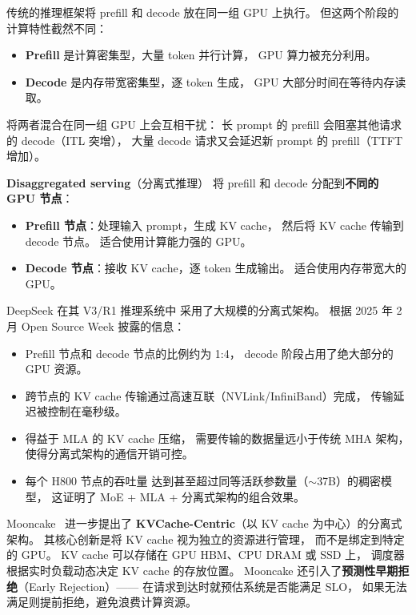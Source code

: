 传统的推理框架将 prefill 和 decode 放在同一组 GPU 上执行。
但这两个阶段的计算特性截然不同：
\begin{itemize}[noitemsep]
  \item \textbf{Prefill} 是计算密集型，大量 token 并行计算，
        GPU 算力被充分利用。
  \item \textbf{Decode} 是内存带宽密集型，逐 token 生成，
        GPU 大部分时间在等待内存读取。
\end{itemize}

将两者混合在同一组 GPU 上会互相干扰：
长 prompt 的 prefill 会阻塞其他请求的 decode（ITL 突增），
大量 decode 请求又会延迟新 prompt 的 prefill（TTFT 增加）。

\textbf{Disaggregated serving}（分离式推理）
将 prefill 和 decode 分配到\textbf{不同的 GPU 节点}：
\begin{itemize}[noitemsep]
  \item \textbf{Prefill 节点}：处理输入 prompt，生成 KV cache，
        然后将 KV cache 传输到 decode 节点。
        适合使用计算能力强的 GPU。
  \item \textbf{Decode 节点}：接收 KV cache，逐 token 生成输出。
        适合使用内存带宽大的 GPU。
\end{itemize}

\begin{corebox}
DeepSeek 在其 V3/R1 推理系统中
采用了大规模的分离式架构。
根据 2025 年 2 月 Open Source Week 披露的信息：

\begin{itemize}[noitemsep]
  \item Prefill 节点和 decode 节点的比例约为 1:4，
        decode 阶段占用了绝大部分的 GPU 资源。
  \item 跨节点的 KV cache 传输通过高速互联（NVLink/InfiniBand）完成，
        传输延迟被控制在毫秒级。
  \item 得益于 MLA 的 KV cache 压缩，
        需要传输的数据量远小于传统 MHA 架构，
        使得分离式架构的通信开销可控。
  \item 每个 H800 节点的吞吐量
        达到甚至超过同等活跃参数量（$\sim$37B）的稠密模型，
        这证明了 MoE + MLA + 分离式架构的组合效果。
\end{itemize}
\end{corebox}

Mooncake~\cite{qin2024mooncake} 进一步提出了
\textbf{KVCache-Centric}（以 KV cache 为中心）的分离式架构。
其核心创新是将 KV cache 视为独立的资源进行管理，
而不是绑定到特定的 GPU。
KV cache 可以存储在 GPU HBM、CPU DRAM 或 SSD 上，
调度器根据实时负载动态决定 KV cache 的存放位置。
Mooncake 还引入了\textbf{预测性早期拒绝}（Early Rejection）——
在请求到达时就预估系统是否能满足 SLO，
如果无法满足则提前拒绝，避免浪费计算资源。

